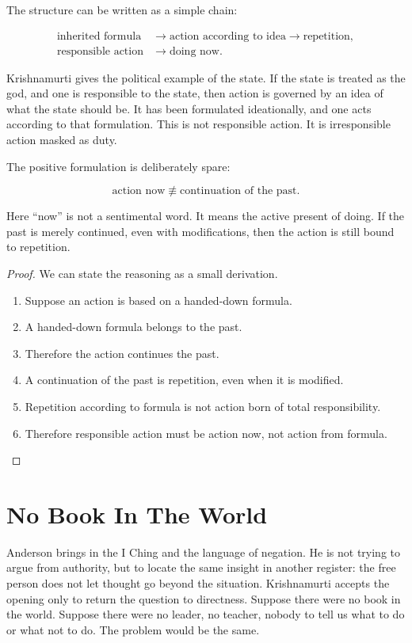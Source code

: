 The structure can be written as a simple chain:

\begin{align}
\text{inherited formula}
&\longrightarrow \text{action according to idea}
\longrightarrow \text{repetition}, \\
\text{responsible action}
&\longrightarrow \text{doing now}.
\end{align}

Krishnamurti gives the political example of the state. If the state is treated as the god, and one is responsible to the state, then action is governed by an idea of what the state should be. It has been formulated ideationally, and one acts according to that formulation. This is not responsible action. It is irresponsible action masked as duty.

The positive formulation is deliberately spare:

\begin{equation}
\text{action now} \not\equiv \text{continuation of the past}.
\end{equation}

Here ``now'' is not a sentimental word. It means the active present of doing. If the past is merely continued, even with modifications, then the action is still bound to repetition.

\begin{proof}
We can state the reasoning as a small derivation.
\begin{enumerate}
\item Suppose an action is based on a handed-down formula.
\item A handed-down formula belongs to the past.
\item Therefore the action continues the past.
\item A continuation of the past is repetition, even when it is modified.
\item Repetition according to formula is not action born of total responsibility.
\item Therefore responsible action must be action now, not action from formula.
\end{enumerate}
\end{proof}

\section{No Book In The World}

Anderson brings in the I Ching and the language of negation. He is not trying to argue from authority, but to locate the same insight in another register: the free person does not let thought go beyond the situation. Krishnamurti accepts the opening only to return the question to directness. Suppose there were no book in the world. Suppose there were no leader, no teacher, nobody to tell us what to do or what not to do. The problem would be the same.

